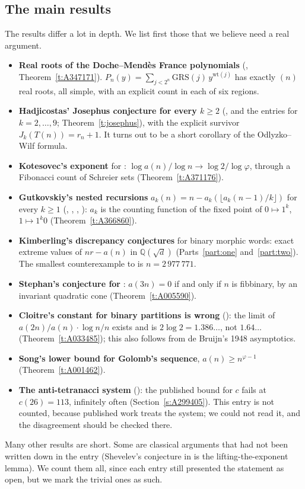 \subsection{The main results}
The results differ a lot in depth. We list first those that we believe need a real argument.
\begin{itemize}
\item \textbf{Real roots of the Doche--Mend\`es France polynomials} (,
  Theorem~\ref{t:A347171}). $P_n(y)=\sum_{j<2^n}\mathrm{GRS}(j)\,y^{\mathrm{wt}(j)}$ has exactly
  $(n)$ real roots, all simple, with an explicit count in each of six regions.
\item \textbf{Hadjicostas' Josephus conjecture for every $k\ge2$} (,  and the
  entries for $k=2,\dots,9$; Theorem~\ref{t:josephus}), with the explicit survivor $J_k(T(n))=r_n+1$. It turns
  out to be a short corollary of the Odlyzko--Wilf formula.
\item \textbf{Kotesovec's exponent} for : $\log a(n)/\log n\to\log2/\log\varphi$, through a
  Fibonacci count of Schreier sets (Theorem~\ref{t:A371176}).
\item \textbf{Gutkovskiy's nested recursions} $a_k(n)=n-a_k(\lfloor a_k(n-1)/k\rfloor)$ for every $k\ge1$
  (, , , ): $a_k$ is the counting function of the
  fixed point of $0\mapsto1^k$, $1\mapsto1^k0$ (Theorem~\ref{t:A366860}).
\item \textbf{Kimberling's discrepancy conjectures} for binary morphic words: exact extreme values of
  $nr-a(n)$ in $\mathbb{Q}(\sqrt d)$ (Parts~\ref{part:one} and~\ref{part:two}). The smallest counterexample to
   is $n=2\,977\,771$.
\item \textbf{Stephan's conjecture for }: $a(3n)=0$ if and only if $n$ is fibbinary, by an
  invariant quadratic cone (Theorem~\ref{t:A005590}).
\item \textbf{Cloitre's constant for binary partitions is wrong} (): the limit of
  $a(2n)/a(n)\cdot\log n/n$ exists and is $2\log2=1.386\ldots$, not $1.64\ldots$ (Theorem~\ref{t:A033485}); this also follows from
  de Bruijn's 1948 asymptotics.
\item \textbf{Song's lower bound for Golomb's sequence}, $a(n)\ge n^{\varphi-1}$ (Theorem~\ref{t:A001462}).
\item \textbf{The anti-tetranacci system} (): the published bound for $c$ fails at
  $c(26)=113$, infinitely often (Section~\ref{s:A299405}). This entry is not counted, because published work
  treats the system; we could not read it, and the disagreement should be checked there.
\end{itemize}
Many other results are short. Some are classical arguments that had not been written down in the entry
(Shevelev's conjecture in  is the lifting-the-exponent lemma). We count them all, since each
entry still presented the statement as open, but we mark the trivial ones as such.

